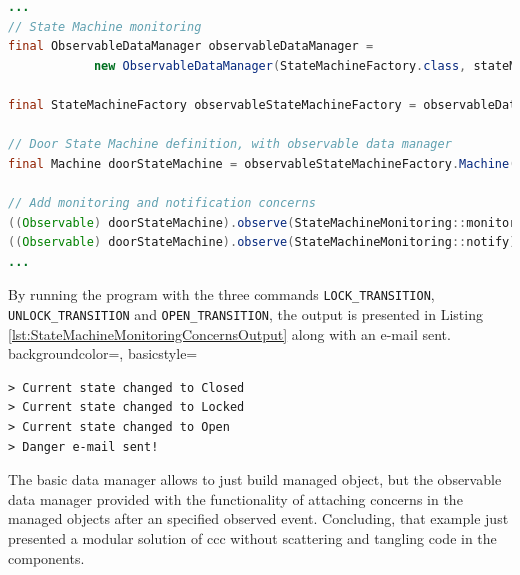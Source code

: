 \begin{sourcecode} [H]
	\begin{lstlisting}[language=Java, escapechar=|]
...
// State Machine monitoring
final ObservableDataManager observableDataManager = 
			new ObservableDataManager(StateMachineFactory.class, stateMachineSchema);

final StateMachineFactory observableStateMachineFactory = observableDataManager.make();

// Door State Machine definition, with observable data manager
final Machine doorStateMachine = observableStateMachineFactory.Machine();

// Add monitoring and notification concerns
((Observable) doorStateMachine).observe(StateMachineMonitoring::monitor); |\label{line:state_machine_monitor}|
((Observable) doorStateMachine).observe(StateMachineMonitoring::notify);  |\label{line:state_machine_notify}|
...
	\end{lstlisting}
	\caption{Door state machine with concerns}
	\label{lst:StateMachineMonitoringConcerns}
\end{sourcecode}

By running the program with the three commands \texttt{LOCK\_TRANSITION}, \texttt{UNLOCK\_TRANSITION} and \texttt{OPEN\_TRANSITION}, the output is presented in Listing \ref{lst:StateMachineMonitoringConcernsOutput} along with an e-mail sent.
 {
    backgroundcolor=\color{white},
    basicstyle=\scriptsize\color{black}\ttfamily
}

\begin{sourcecode} [H]
	\lstset{numbers=none}
	\begin{lstlisting}[style=Bash]
> Current state changed to Closed
> Current state changed to Locked
> Current state changed to Open
> Danger e-mail sent!
	\end{lstlisting}
	\caption{Door state machine with concerns: output}
	\label{lst:StateMachineMonitoringConcernsOutput}
\end{sourcecode}

The basic data manager allows to just build managed object, but the observable data manager provided with the functionality of attaching concerns in the managed objects after an specified observed event.
Concluding, that example just presented a modular solution of \ac{ccc} without scattering and tangling code in the components.
